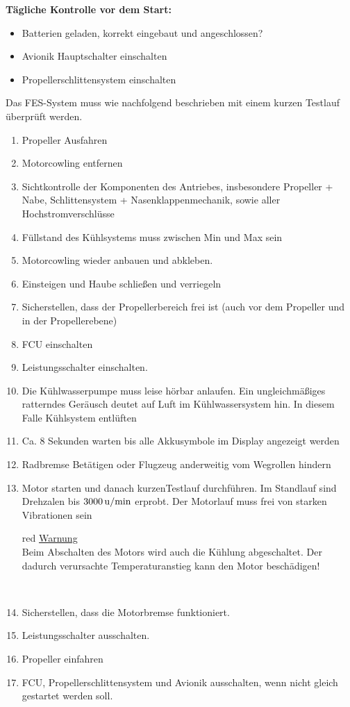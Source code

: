 \textbf{Tägliche Kontrolle vor dem Start: \\}
\begin{itemize}
\item Batterien geladen, korrekt eingebaut und angeschlossen?
\item Avionik Hauptschalter einschalten
\item Propellerschlittensystem einschalten
\end{itemize}

Das FES-System muss wie nachfolgend beschrieben mit einem kurzen Testlauf überprüft werden.\\

\begin{enumerate}

\item Propeller Ausfahren
\item	Motorcowling entfernen
\item	Sichtkontrolle der Komponenten des Antriebes, insbesondere Propeller + Nabe, Schlittensystem + Nasenklappenmechanik, sowie aller Hochstromverschlüsse
\item	 Füllstand des Kühlsystems muss zwischen Min und Max sein
\item	 Motorcowling wieder anbauen und abkleben.
\item	Einsteigen und Haube schließen und verriegeln
\item	 Sicherstellen, dass der Propellerbereich frei ist (auch vor dem Propeller und in der Propellerebene)
\item	FCU einschalten
\item	Leistungsschalter einschalten.
\item	Die Kühlwasserpumpe muss leise hörbar anlaufen. Ein ungleichmäßiges ratterndes Geräusch deutet auf Luft im Kühlwassersystem hin. In diesem Falle Kühlsystem entlüften
\item	Ca. 8 Sekunden warten bis alle Akkusymbole im Display angezeigt werden
\item	Radbremse Betätigen oder Flugzeug anderweitig vom Wegrollen hindern
\item	 Motor starten und danach kurzenTestlauf durchführen. Im Standlauf sind Drehzalen bis $\unit[3000]{u/min}$ erprobt. Der Motorlauf muss frei von starken Vibrationen sein

\begin{color}{red}
\large{\underline{Warnung}}\\
Beim Abschalten des Motors wird auch die Kühlung abgeschaltet. Der dadurch verursachte Temperaturanstieg kann den Motor beschädigen!
\end{color}\\

\item	Sicherstellen, dass die Motorbremse funktioniert.
\item	Leistungsschalter ausschalten.
\item	Propeller einfahren
\item	FCU, Propellerschlittensystem und Avionik ausschalten, wenn nicht gleich gestartet werden soll.
\end{enumerate}


